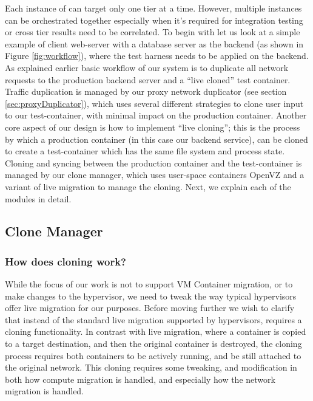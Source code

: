 Each instance of \parikshan can target only one tier at a time.
However, multiple instances can be orchestrated together especially when it's required for integration testing or cross tier results need to be correlated.
To begin with let us look at a simple example of client web-server with a database server as the backend (as shown in Figure \ref{fig:workflow}), where the test harness needs to be applied on the backend.
As explained earlier basic workflow of our system is to duplicate all network requests to the production backend server and a ``live cloned'' test container.
Traffic duplication is managed by our proxy network duplicator (see section \ref{sec:proxyDuplicator}), which uses several different strategies to clone user input to our test-container, with minimal impact on the production container.
Another core aspect of our design is how to implement ``live cloning''; this is the process by which a production container (in this case our backend service), can be cloned to create a test-container which has the same file system and process state. 
Cloning and syncing between the production container and the test-container is managed by our clone manager, which uses user-space containers OpenVZ and a variant of live migration to manage the cloning.
Next, we explain each of the modules in detail.


\subsection{Clone Manager} 
\label{sec:CloneManager}

\subsubsection{How does cloning work?}
\label{sec:cloning}

While the focus of our work is not to support VM Container migration, or to make changes to the hypervisor, we need to tweak the way typical hypervisors offer live migration for our purposes.
Before moving further we wish to clarify that instead of the standard live migration supported by hypervisors, \parikshan requires a cloning functionality. 
In contrast with live migration, where a container is copied to a target destination, and then the original container is destroyed, the cloning process requires both containers to be actively running, and be still attached to the original network.
This cloning requires some tweaking, and modification in both how compute migration is handled, and especially how the network migration is handled. 

